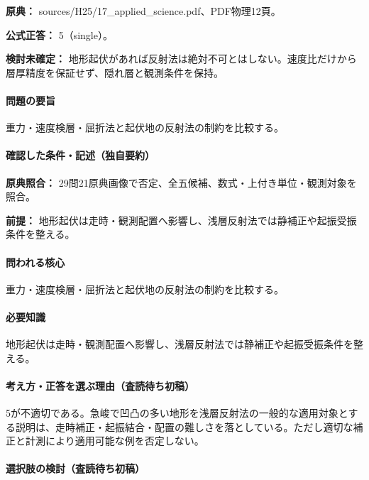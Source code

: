 \noindent\textbf{原典：} sources/H25/17\_applied\_science.pdf、PDF物理12頁。

\textbf{公式正答：} 5（single）。

\par\textbf{検討未確定：} 地形起伏があれば反射法は絶対不可とはしない。速度比だけから層厚精度を保証せず、隠れ層と観測条件を保持。

\paragraph{問題の要旨} 重力・速度検層・屈折法と起伏地の反射法の制約を比較する。

\paragraph{確認した条件・記述（独自要約）}\mbox{}\par

\noindent\textbf{原典照合：} 29問21原典画像で否定、全五候補、数式・上付き単位・観測対象を照合。\par

\noindent\textbf{前提：} 地形起伏は走時・観測配置へ影響し、浅層反射法では静補正や起振受振条件を整える。\par

\paragraph{問われる核心} 重力・速度検層・屈折法と起伏地の反射法の制約を比較する。

\paragraph{必要知識} 地形起伏は走時・観測配置へ影響し、浅層反射法では静補正や起振受振条件を整える。

\paragraph{考え方・正答を選ぶ理由（査読待ち初稿）} 5が不適切である。急峻で凹凸の多い地形を浅層反射法の一般的な適用対象とする説明は、走時補正・起振結合・配置の難しさを落としている。ただし適切な補正と計測により適用可能な例を否定しない。

\paragraph{選択肢の検討（査読待ち初稿）}\mbox{}\par

